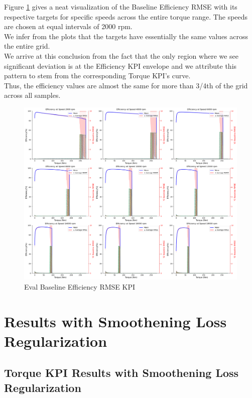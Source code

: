 \documentclass{report} %
\begin{document}
Figure \ref{fig:Eval Baseline Efficiency RMSE KPI} gives a neat visualization of the Baseline Efficiency \ac{RMSE} with its respective targets for specific speeds across the entire torque range.
The speeds are chosen at equal intervals of 2000 rpm.\\
We infer from the plots that the targets have essentially the same values across the entire grid.\\
We arrive at this conclusion from the fact that the only region where we see significant deviation is at the Efficiency \ac{KPI} envelope and we attribute this pattern to stem from the corresponding Torque \ac{KPI}'s curve. \\
Thus, the efficiency values are almost the same for more than 3/4th of the grid across all samples.\\
\begin{figure}[H]
    \centering
    \includegraphics[width=1\textwidth]{./ReportImages/rmse_eta_Baseline.png} 
    \caption{Eval Baseline Efficiency \ac{RMSE} \ac{KPI}} 
    \label{fig:Eval Baseline Efficiency RMSE KPI}
\end{figure}

\section{Results with Smoothening Loss Regularization}\label{sec:Results with Smoothening Loss Regularization}

\subsection{Torque \ac{KPI} Results with Smoothening Loss Regularization}\label{subsec:2D Torque Results with Smoothening Loss Regularization}
\end{document}
